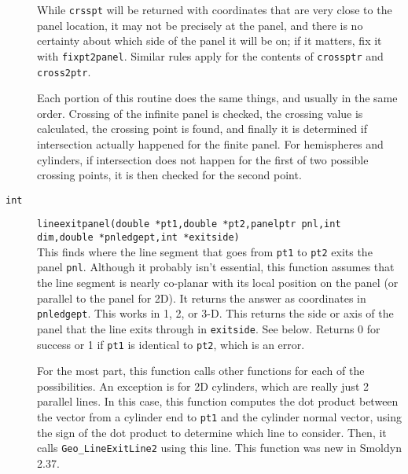 \documentclass {book}
\newcommand {\ttt} {\texttt}
\begin{document}
\begin{description}
While \ttt{crsspt} will be returned with coordinates that are very close to the panel location, it may not be precisely at the panel, and there is no certainty about which side of the panel it will be on; if it matters, fix it with \ttt{fixpt2panel}. Similar rules apply for the contents of \ttt{crossptr} and \ttt{cross2ptr}.

Each portion of this routine does the same things, and usually in the same order. Crossing of the infinite panel is checked, the crossing value is calculated, the crossing point is found, and finally it is determined if intersection actually happened for the finite panel. For hemispheres and cylinders, if intersection does not happen for the first of two possible crossing points, it is then checked for the second point.

\item[\ttt{int}]
\ttt{lineexitpanel(double *pt1,double *pt2,panelptr pnl,int dim,double *pnledgept,int *exitside)}
\hfill \\
This finds where the line segment that goes from \ttt{pt1} to \ttt{pt2} exits the panel \ttt{pnl}. Although it probably isn't essential, this function assumes that the line segment is nearly co-planar with its local position on the panel (or parallel to the panel for 2D). It returns the answer as coordinates in \ttt{pnledgept}. This works in 1, 2, or 3-D. This returns the side or axis of the panel that the line exits through in \ttt{exitside}. See below. Returns 0 for success or 1 if \ttt{pt1} is identical to \ttt{pt2}, which is an error.

For the most part, this function calls other functions for each of the possibilities. An exception is for 2D cylinders, which are really just 2 parallel lines. In this case, this function computes the dot product between the vector from a cylinder end to \ttt{pt1} and the cylinder normal vector, using the sign of the dot product to determine which line to consider. Then, it calls \ttt{Geo\_LineExitLine2} using this line. This function was new in Smoldyn 2.37.


\end{description}
\end{document}
